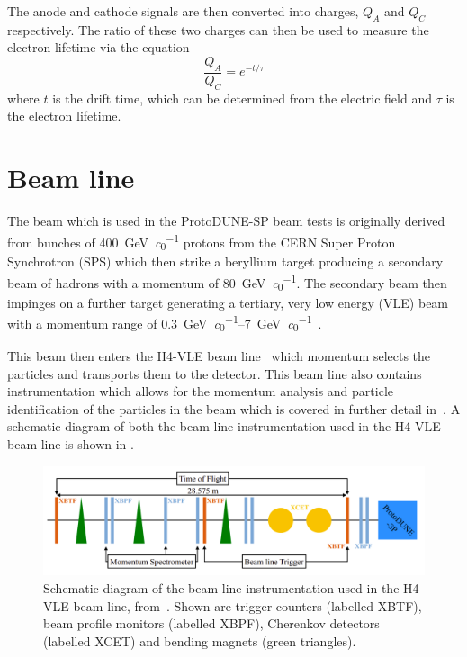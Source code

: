 The anode and cathode signals are then converted into charges, $Q_{A}$ and $Q_{C}$ respectively.
The ratio of these two charges can then be used to measure the electron lifetime via the equation
\begin{equation}
\frac{Q_{A}}{Q_{C}} = e^{-t/\tau}
\end{equation}
where $t$ is the drift time, which can be determined from the electric field and $\tau$ is the electron lifetime.

\section{Beam line}
\label{sec:protodune:beam}

The beam which is used in the ProtoDUNE-SP beam tests is originally derived from bunches of \SI{400}{\GeV\per\clight} protons from the CERN Super Proton Synchrotron (SPS) which then strike a beryllium target producing a secondary beam of hadrons with a momentum of \SI{80}{\GeV\per\clight}.
The secondary beam then impinges on a further target generating a tertiary, very low energy (VLE) beam with a momentum range of \SIrange{0.3}{7}{\GeV\per\clight}~\cite{protodunePerformance}.

This beam then enters the H4-VLE beam line~\cite{h4vle} which momentum selects the particles and transports them to the detector.
This beam line also contains instrumentation which allows for the momentum analysis and particle identification of the particles in the beam which is covered in further detail in~\cite{boothBeamLineInstr}.
A schematic diagram of both the beam line instrumentation used in the H4 VLE beam line is shown in .

\begin{figure}[h]
	\centering
	\includegraphics[width=\linewidth]{files/figures/protodune_detector/h4vleDiag}
	\caption[Schematic diagram of the beam line instrumentation used in the H4-VLE beam line]{Schematic diagram of the beam line instrumentation used in the H4-VLE beam line, from~\cite{protodunePerformance}. Shown are trigger counters (labelled XBTF), beam profile monitors (labelled XBPF), Cherenkov detectors (labelled XCET) and bending magnets (green triangles).}
	\label{fig:h4vleDiag}
\end{figure}

